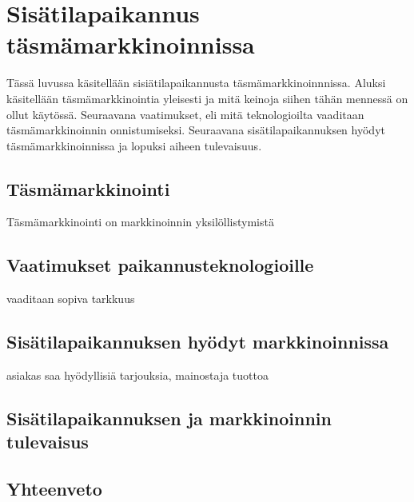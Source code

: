 \section{Sisätilapaikannus täsmämarkkinoinnissa}
Tässä luvussa käsitellään sisiätilapaikannusta täsmämarkkinoinnnissa. Aluksi käsitellään täsmämarkkinointia yleisesti ja mitä keinoja siihen tähän mennessä on ollut käytössä. Seuraavana vaatimukset, eli mitä teknologioilta vaaditaan täsmämarkkinoinnin onnistumiseksi. Seuraavana sisätilapaikannuksen hyödyt täsmämarkkinoinnissa ja lopuksi aiheen tulevaisuus.
\subsection{Täsmämarkkinointi}
Täsmämarkkinointi on markkinoinnin yksilöllistymistä
\subsection{Vaatimukset paikannusteknologioille}
vaaditaan sopiva tarkkuus
\subsection{Sisätilapaikannuksen hyödyt markkinoinnissa}
asiakas saa hyödyllisiä tarjouksia, mainostaja tuottoa
\subsection{Sisätilapaikannuksen ja markkinoinnin tulevaisus}
\subsection{Yhteenveto}